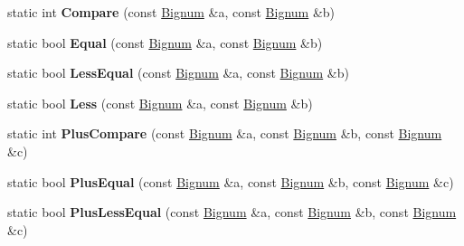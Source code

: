 \begin{DoxyCompactItemize}
\item 
\hypertarget{classv8_1_1internal_1_1_bignum_abd9070a6a20568f1d8cd3a08aef2b83e}{}static int {\bfseries Compare} (const \hyperlink{classv8_1_1internal_1_1_bignum}{Bignum} \&a, const \hyperlink{classv8_1_1internal_1_1_bignum}{Bignum} \&b)\label{classv8_1_1internal_1_1_bignum_abd9070a6a20568f1d8cd3a08aef2b83e}

\item 
\hypertarget{classv8_1_1internal_1_1_bignum_a59b3c8a39ea9d736d20360cffe274acb}{}static bool {\bfseries Equal} (const \hyperlink{classv8_1_1internal_1_1_bignum}{Bignum} \&a, const \hyperlink{classv8_1_1internal_1_1_bignum}{Bignum} \&b)\label{classv8_1_1internal_1_1_bignum_a59b3c8a39ea9d736d20360cffe274acb}

\item 
\hypertarget{classv8_1_1internal_1_1_bignum_a6b79c599b480768a071b4c78953d1377}{}static bool {\bfseries Less\+Equal} (const \hyperlink{classv8_1_1internal_1_1_bignum}{Bignum} \&a, const \hyperlink{classv8_1_1internal_1_1_bignum}{Bignum} \&b)\label{classv8_1_1internal_1_1_bignum_a6b79c599b480768a071b4c78953d1377}

\item 
\hypertarget{classv8_1_1internal_1_1_bignum_a8ac355faefc238fb7896d9f9b8f92a14}{}static bool {\bfseries Less} (const \hyperlink{classv8_1_1internal_1_1_bignum}{Bignum} \&a, const \hyperlink{classv8_1_1internal_1_1_bignum}{Bignum} \&b)\label{classv8_1_1internal_1_1_bignum_a8ac355faefc238fb7896d9f9b8f92a14}

\item 
\hypertarget{classv8_1_1internal_1_1_bignum_abcc8a3bef0ecc80e0fdf91cf3525930f}{}static int {\bfseries Plus\+Compare} (const \hyperlink{classv8_1_1internal_1_1_bignum}{Bignum} \&a, const \hyperlink{classv8_1_1internal_1_1_bignum}{Bignum} \&b, const \hyperlink{classv8_1_1internal_1_1_bignum}{Bignum} \&c)\label{classv8_1_1internal_1_1_bignum_abcc8a3bef0ecc80e0fdf91cf3525930f}

\item 
\hypertarget{classv8_1_1internal_1_1_bignum_aee160e99c96f72218c024a094f5fa9f4}{}static bool {\bfseries Plus\+Equal} (const \hyperlink{classv8_1_1internal_1_1_bignum}{Bignum} \&a, const \hyperlink{classv8_1_1internal_1_1_bignum}{Bignum} \&b, const \hyperlink{classv8_1_1internal_1_1_bignum}{Bignum} \&c)\label{classv8_1_1internal_1_1_bignum_aee160e99c96f72218c024a094f5fa9f4}

\item 
\hypertarget{classv8_1_1internal_1_1_bignum_a3c1bd429a2efc47c8ddf0b94db3718ff}{}static bool {\bfseries Plus\+Less\+Equal} (const \hyperlink{classv8_1_1internal_1_1_bignum}{Bignum} \&a, const \hyperlink{classv8_1_1internal_1_1_bignum}{Bignum} \&b, const \hyperlink{classv8_1_1internal_1_1_bignum}{Bignum} \&c)\label{classv8_1_1internal_1_1_bignum_a3c1bd429a2efc47c8ddf0b94db3718ff}


\end{DoxyCompactItemize}
